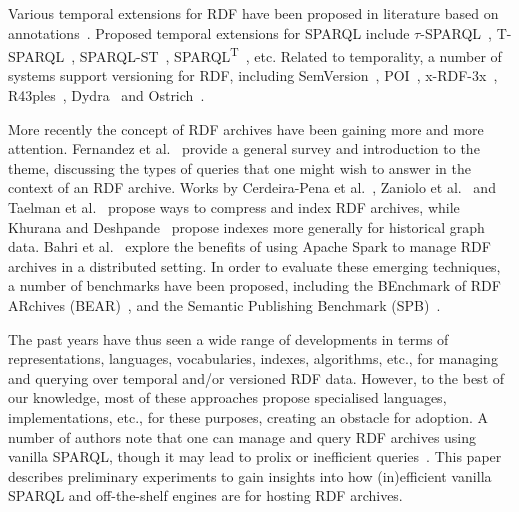 \documentclass{llncs}
\begin{document}
Various temporal extensions for RDF have been proposed in literature based on annotations~\cite{GutierrezHV07,PuglieseUS08,ZimmermannLPS12}. Proposed temporal extensions for SPARQL include $\tau$-SPARQL~\cite{TappoletB09}, T-SPARQL~\cite{Grandi10}, SPARQL-ST~\cite{PerryJS11}, SPARQL\textsuperscript{T}~\cite{ZanioloGACG18}, etc. Related to temporality, a number of systems support versioning for RDF, including SemVersion~\cite{VolkelG06}, POI~\cite{TzitzikasTA08}, x-RDF-3x~\cite{NeumannW10}, R43ples~\cite{GraubeHU14}, Dydra~\cite{AndersonB16} and Ostrich~\cite{TaelmanSV18}.

More recently the concept of RDF archives have been gaining more and more attention. Fernandez et al.~\cite{FernandezPU15} provide a general survey and introduction to the theme, discussing the types of queries that one might wish to answer in the context of an RDF archive. Works by Cerdeira{-}Pena et al.~\cite{Cerdeira-PenaFF16}, Zaniolo et al.~\cite{ZanioloGACG18} and Taelman et al.~\cite{TaelmanSHMV19} propose ways to compress and index RDF archives, while Khurana and Deshpande~\cite{KhuranaD16} propose indexes more generally for historical graph data. Bahri et al.~\cite{BahriLA18} explore the benefits of using Apache Spark to manage RDF archives in a distributed setting. In order to evaluate these emerging techniques, a number of benchmarks have been proposed, including the BEnchmark of RDF
ARchives (BEAR)~\cite{FernandezUPK19}, and the Semantic Publishing Benchmark (SPB)~\cite{Papakonstantinou18}.

The past years have thus seen a wide range of developments in terms of representations, languages, vocabularies, indexes, algorithms, etc., for managing and querying over temporal and/or versioned RDF data. However, to the best of our knowledge, most of these approaches propose specialised languages, implementations, etc., for these purposes, creating an obstacle for adoption. %
A number of authors note that one can manage and query RDF archives using vanilla SPARQL, though it may lead to prolix or inefficient queries~\cite{TappoletB09,FernandezUPK19}. This paper describes preliminary experiments to gain insights into how (in)efficient vanilla SPARQL and off-the-shelf engines are for hosting RDF archives.
\end{document}
